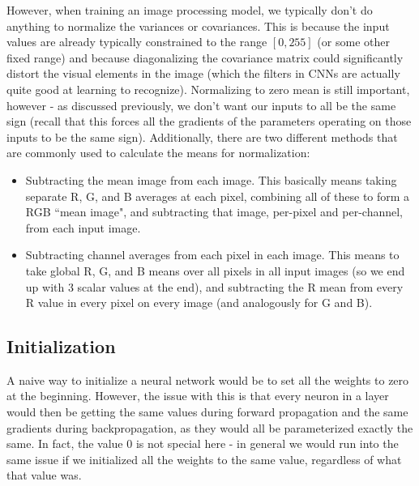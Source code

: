 However, when training an image processing model, we typically don't do anything to normalize the variances or covariances. This is because the input values are already typically constrained to the range $[0, 255]$ (or some other fixed range) and because diagonalizing the covariance matrix could significantly distort the visual elements in the image (which the filters in CNNs are actually quite good at learning to recognize). Normalizing to zero mean is still important, however - as discussed previously, we don't want our inputs to all be the same sign (recall that this forces all the gradients of the parameters operating on those inputs to be the same sign). Additionally, there are two different methods that are commonly used to calculate the means for normalization:
\begin{itemize}
\item Subtracting the mean image from each image. This basically means taking separate R, G, and B averages at each pixel, combining all of these to form a RGB ``mean image", and subtracting that image, per-pixel and per-channel, from each input image.
\item Subtracting channel averages from each pixel in each image. This means to take global R, G, and B means over all pixels in all input images (so we end up with 3 scalar values at the end), and subtracting the R mean from every R value in every pixel on every image (and analogously for G and B).
\end{itemize}

\subsection{Initialization}
A naive way to initialize a neural network would be to set all the weights to zero at the beginning. However, the issue with this is that every neuron in a layer would then be getting the same values during forward propagation and the same gradients during backpropagation, as they would all be parameterized exactly the same. In fact, the value 0 is not special here - in general we would run into the same issue if we initialized all the weights to the same value, regardless of what that value was.

